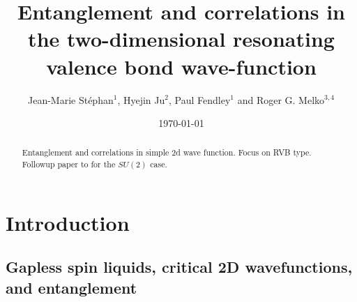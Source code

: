 \documentclass[11pt]{iopart}
\begin{document}
 
\title[Entanglement and Correlations in the 2D RVB wave function]{Entanglement and correlations in the two-dimensional resonating valence bond wave-function}
 
\author{Jean-Marie St\'ephan$^1$, Hyejin Ju$^2$, Paul Fendley$^1$ and Roger G. Melko$^{3,4}$}

\address{$^1$ Physics Department, University of Virginia, Charlottesville, VA 22904-4714}

\address{$^2$ Department of Physics, University of California, Santa Barbara, CA, 93106-9530}

\address{$^3$ Department of Physics and Astronomy, University of Waterloo, Ontario, N2L 3G1, Canada}

\address{$^4$ Perimeter Institute for Theoretical Physics, Waterloo, Ontario N2L 2Y5, Canada}



\date{\today}
\begin{abstract}
 Entanglement and correlations in simple 2d wave function. Focus on RVB type. Followup paper to \cite{Ju2012} for the $SU(2)$ case.
\end{abstract}
\maketitle

\tableofcontents

\section{Introduction}
\label{sec:introduction}
\subsection{Gapless spin liquids, critical 2D wavefunctions, and entanglement}
\end{document}
